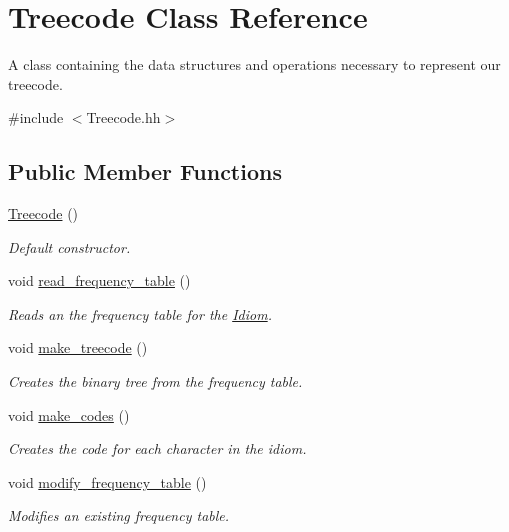\hypertarget{classTreecode}{}\section{Treecode Class Reference}
\label{classTreecode}


A class containing the data structures and operations necessary to represent our treecode.  




{\ttfamily \#include $<$Treecode.\+hh$>$}

\subsection*{Public Member Functions}
\begin{DoxyCompactItemize}
\item 
\hyperlink{classTreecode_a190d6af790b7046ed7c96e7a57f0cd38}{Treecode} ()
\begin{DoxyCompactList}\small\item\em Default constructor. \end{DoxyCompactList}\item 
void \hyperlink{classTreecode_a2333bf6b33a3047d8dde155c70e93683}{read\+\_\+frequency\+\_\+table} ()
\begin{DoxyCompactList}\small\item\em Reads an the frequency table for the \hyperlink{classIdiom}{Idiom}. \end{DoxyCompactList}\item 
void \hyperlink{classTreecode_a13f2c35999457b6d631796635a46ce54}{make\+\_\+treecode} ()
\begin{DoxyCompactList}\small\item\em Creates the binary tree from the frequency table. \end{DoxyCompactList}\item 
void \hyperlink{classTreecode_ab8e5229b371389a3036c548ce180ce7f}{make\+\_\+codes} ()
\begin{DoxyCompactList}\small\item\em Creates the code for each character in the idiom. \end{DoxyCompactList}\item 
void \hyperlink{classTreecode_a24cda3e081573d54fb3c51ec0135f653}{modify\+\_\+frequency\+\_\+table} ()
\begin{DoxyCompactList}\small\item\em Modifies an existing frequency table. \end{DoxyCompactList}\item 

\end{DoxyCompactItemize}
